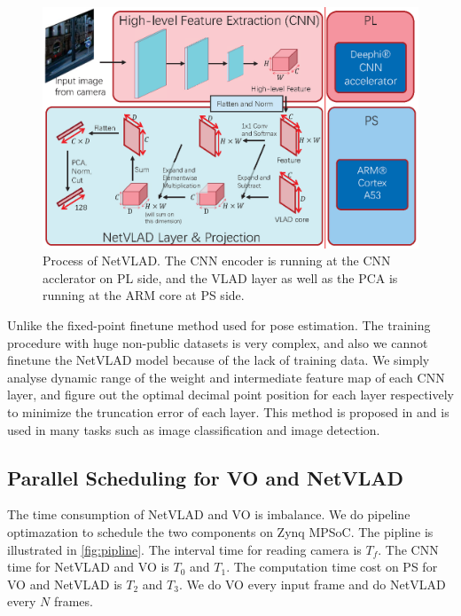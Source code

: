 \begin{figure}[t]
    \centering  
    \includegraphics[width=0.95\linewidth]{fig/NetVLAD.eps}
    \caption{Process of NetVLAD. The CNN encoder is running at the CNN acclerator on PL side, and the VLAD layer as well as the PCA is running at the ARM core at PS side.}
    \label{fig:NetVLAD}
\end{figure}

Unlike the fixed-point finetune method used for pose estimation. The training procedure with huge non-public datasets is very complex, and also we cannot finetune the NetVLAD model because of the lack of training data. We simply analyse dynamic range of the weight and intermediate feature map of each CNN layer, and figure out the optimal decimal point position for each layer respectively to minimize the truncation error of each layer.
This method is proposed in \cite{Qiu:2016151} and is used in many tasks such as image classification and image detection.

\subsection{Parallel Scheduling for VO and NetVLAD}

The time consumption of NetVLAD and VO is imbalance. We do pipeline optimazation to schedule the two components on Zynq MPSoC. The pipline is illustrated in \cref{fig:pipline}. The interval time for reading camera is $T_{f}$. The CNN time for NetVLAD and VO is $T_{0}$ and $T_{1}$. The computation time cost on PS for VO and NetVLAD is $T_{2}$ and $T_{3}$. We do VO every input frame and do NetVLAD every $N$ frames.

